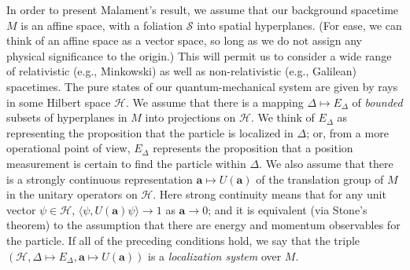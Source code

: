 \documentclass[12pt]{article}
\theoremstyle{remark}
\newcommand{\locsys}{(\mathcal{H},\Delta \mapsto
  E_{\Delta},\mathbf{a}\mapsto U(\mathbf{a}))}
\newcommand{\hil}[1]{\mathcal{#1}}
\begin{document}
In order to present Malament's result, we assume that our background
spacetime $M$ is an affine space, with a foliation $\mathcal{S}$ into
spatial hyperplanes.  (For ease, we can think of an affine space as a
vector space, so long as we do not assign any physical significance to
the origin.)  This will permit us to consider a wide range of
relativistic (e.g., Minkowski) as well as non-relativistic (e.g.,
Galilean) spacetimes.  The pure states of our quantum-mechanical
system are given by rays in some Hilbert space $\hil{H}$.  We assume
that there is a mapping $\Delta \mapsto E_{\Delta}$ of \emph{bounded}
subsets of hyperplanes in $M$ into projections on $\hil{H}$.  We think
of $E_{\Delta}$ as representing the proposition that the particle is
localized in $\Delta$; or, from a more operational point of view,
$E_{\Delta}$ represents the proposition that a position measurement is
certain to find the particle within $\Delta$.  We also assume that
there is a strongly continuous representation $\mathbf{a}\mapsto
U(\mathbf{a})$ of the translation group of $M$ in the unitary
operators on $\hil{H}$.  Here strong continuity means that for any
unit vector $\psi \in \hil{H}$, $\langle \psi,U(\mathbf{a})\psi
\rangle \rightarrow 1$ as $\mathbf{a}\rightarrow 0$; and it is
equivalent (via Stone's theorem) to the assumption that there are
energy and momentum observables for the particle.  If all of the
preceding conditions hold, we say that the triple $\locsys$ is a
\emph{localization system} over $M$.
\end{document}
